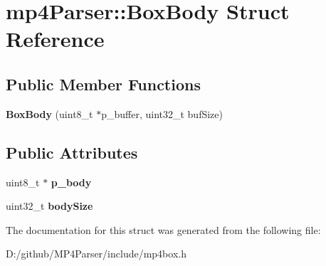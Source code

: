 \hypertarget{structmp4_parser_1_1_box_body}{}\section{mp4\+Parser\+::Box\+Body Struct Reference}
\label{structmp4_parser_1_1_box_body}
\subsection*{Public Member Functions}
\begin{DoxyCompactItemize}
\item 
\mbox{\label{structmp4_parser_1_1_box_body_ab551396a1bd23d93fc27d9d81cb5fa1b}} 
{\bfseries Box\+Body} (uint8\+\_\+t $\ast$p\+\_\+buffer, uint32\+\_\+t buf\+Size)
\end{DoxyCompactItemize}
\subsection*{Public Attributes}
\begin{DoxyCompactItemize}
\item 
\mbox{\label{structmp4_parser_1_1_box_body_a7457b50d3e36d475f8874cb5882f4af7}} 
uint8\+\_\+t $\ast$ {\bfseries p\+\_\+body}
\item 
\mbox{\label{structmp4_parser_1_1_box_body_a67ecf2176507e356f4295d23f7b88b4c}} 
uint32\+\_\+t {\bfseries body\+Size}
\end{DoxyCompactItemize}


The documentation for this struct was generated from the following file\+:\begin{DoxyCompactItemize}
\item 
D\+:/github/\+M\+P4\+Parser/include/mp4box.\+h\end{DoxyCompactItemize}
